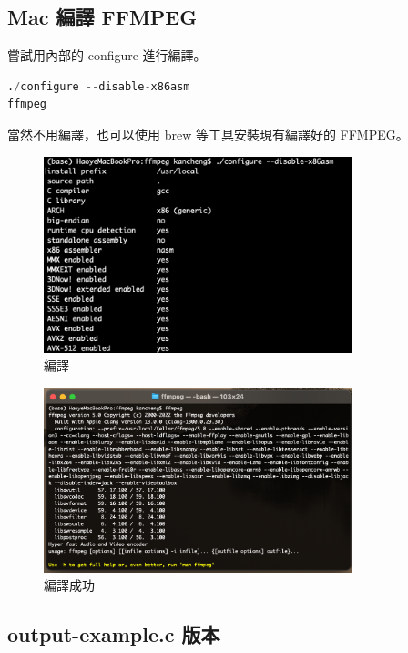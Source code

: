 \documentclass[10pt,UTF8]{ctexart}
\begin{document}
\subsection{Mac 編譯 FFMPEG}

嘗試用內部的 configure 進行編譯。

\begin{lstlisting}[language={python}]
./configure --disable-x86asm
ffmpeg
\end{lstlisting}

當然不用編譯，也可以使用 brew 等工具安裝現有編譯好的 FFMPEG。

\begin{figure}[H]
\centering 
\includegraphics[width=0.80\textwidth]{r1.png} 
\caption{編譯}
\label{Test}
\end{figure}

\begin{figure}[H]
\centering 
\includegraphics[width=0.80\textwidth]{r2.png} 
\caption{編譯成功}
\label{Test}
\end{figure}

\subsection{output-example.c 版本}
\end{document}
